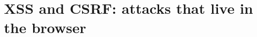 \chapter{XSS and CSRF: attacks that live in the browser}
\label{ch:xss-and-csrf-attacks-that-live-in-the}

